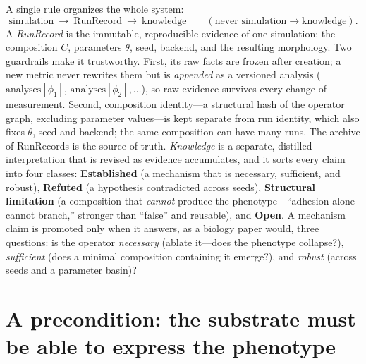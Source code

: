 \documentclass[11pt]{article}
\begin{document}
A single rule organizes the whole system:
\[
\text{simulation}\ \longrightarrow\ \text{RunRecord}\ \longrightarrow\ \text{knowledge}
\qquad(\text{never } \text{simulation}\longrightarrow\text{knowledge}).
\]
A \emph{RunRecord} is the immutable, reproducible evidence of one simulation: the composition $C$, parameters $\theta$, seed, backend, and the resulting morphology. Two guardrails make it trustworthy. First, its raw facts are frozen after creation; a new metric never rewrites them but is \emph{appended} as a versioned analysis (\,$\text{analyses}[\phi_1]$, $\text{analyses}[\phi_2],\dots$), so raw evidence survives every change of measurement. Second, composition identity---a structural hash of the operator graph, excluding parameter values---is kept separate from run identity, which also fixes $\theta$, seed and backend; the same composition can have many runs. The archive of RunRecords is the source of truth. \emph{Knowledge} is a separate, distilled interpretation that is revised as evidence accumulates, and it sorts every claim into four classes: \textbf{Established} (a mechanism that is necessary, sufficient, and robust), \textbf{Refuted} (a hypothesis contradicted across seeds), \textbf{Structural limitation} (a composition that \emph{cannot} produce the phenotype---``adhesion alone cannot branch,'' stronger than ``false'' and reusable), and \textbf{Open}. A mechanism claim is promoted only when it answers, as a biology paper would, three questions: is the operator \emph{necessary} (ablate it---does the phenotype collapse?), \emph{sufficient} (does a minimal composition containing it emerge?), and \emph{robust} (across seeds and a parameter basin)?

\section*{A precondition: the substrate must be able to express the phenotype}
\end{document}
